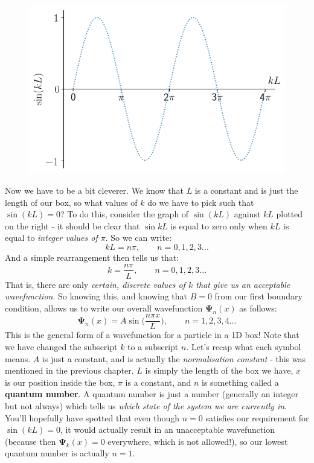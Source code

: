 \documentclass{memoir}[11pt,oneside,a4paper,openany]
\newcommand{\wf}{\ensuremath{\bm{\Psi}}\xspace}
\begin{document}
\begin{figure}
	\includegraphics[width=\linewidth]{boundary_conditions_pinbox.png}
\end{figure}
Now we have to be a bit cleverer. We know that $L$ is a constant and is just the length of our box, so what values of $k$ do we have to pick such that $\sin(kL)=0$? To do this, consider the graph of $\sin(kL)$ against $kL$ plotted on the right - it should be clear that $\sin{kL}$ is equal to zero only when $kL$ is equal to \emph{integer values of $\pi$}. So we can write:
\begin{equation*}
	kL = n\pi, \qquad  n=0,1,2,3...
\end{equation*}
And a simple rearrangement then tells us that:
\begin{equation*}
	k = \frac{n\pi}{L}, \qquad n=0,1,2,3...
\end{equation*}
That is, there are only \emph{certain, discrete values of $k$ that give us an acceptable wavefunction}. So knowing this, and knowing that $B=0$ from our first boundary condition, allows us to write our overall wavefunction $\wf_n(x)$ as follows:
\begin{equation}
	\wf_n(x) = A\sin\bigg(\frac{n\pi x}{L}\bigg), \qquad n = 1,2,3,4...
\end{equation}
This is the general form of a wavefunction for a particle in a 1D box! Note that we have changed the subscript $k$ to a subscript $n$. Let's recap what each symbol means. $A$ is just a constant, and is actually the \emph{normalisation constant} - this was mentioned in the previous chapter. $L$ is simply the length of the box we have, $x$ is our position inside the box, $\pi$ is a constant, and $n$ is something called a \textbf{quantum number}. A quantum number is just a number (generally an integer but not always) which tells us \emph{which state of the system we are currently in}. You'll hopefully have spotted that even though $n=0$ satisfies our requirement for $\sin(kL) = 0$, it would actually result in an unacceptable wavefunction (because then $\wf_k(x) = 0$ everywhere, which is not allowed!), so our lowest quantum number is actually $n=1$. 
\end{document}
